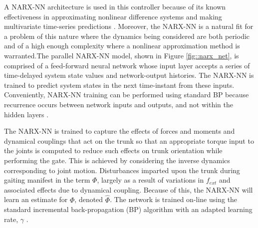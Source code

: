
A NARX-NN architecture is used in this controller because of  its known effectiveness in approximating nonlinear difference systems and making multivariate time-series predictions \cite{Tsungnan1996,ChenBillings1990,Hihi1996,Billings2013}. Moreover, the NARX-NN is a natural fit for a problem of this nature where the dynamics being considered are both periodic and of a high enough complexity where a nonlinear approximation method is warranted.The parallel NARX-NN model, shown in Figure \ref{fig::narx_net}, is comprised of a feed-forward neural network whose input layer accepts a series of time-delayed system state values and network-output histories. The NARX-NN is trained to predict system states in the next time-instant from these inputs. Conveniently, NARX-NN training can be performed using standard BP because recurrence occurs between network inputs and outputs, and not within the hidden layers \cite{Nelles2001}.

The NARX-NN is trained to capture the effects of forces and moments and dynamical couplings that act on the trunk so that an appropriate torque input to the joints is computed to reduce such effects on trunk orientation while performing the gate. This is achieved by considering the inverse dynamics corresponding to joint motion. Disturbances imparted upon the trunk during gaiting manifest in the term $\Phi$, largely as a result of variations in $f_{ext}$ and associated effects due to dynamical coupling. Because of this, the NARX-NN will learn an estimate for $\Phi$, denoted $\hat{\Phi}$. The network is trained on-line using the standard incremental back-propagation (BP) algorithm with an adapted learning rate, $\gamma$ \cite{Rumelhart1988,Rumelhart1995}.

